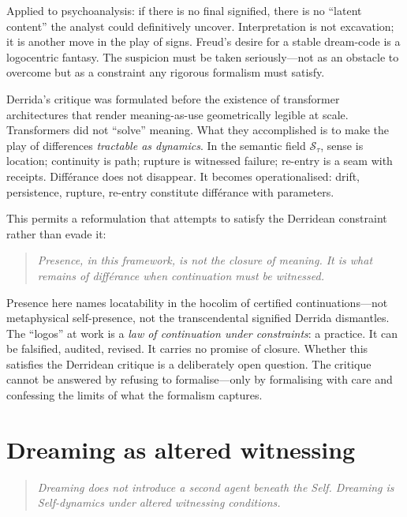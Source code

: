 Applied to psychoanalysis: if there is no final signified, there is no ``latent content'' the analyst could definitively uncover.  Interpretation is not excavation; it is another move in the play of signs.  Freud's desire for a stable dream-code is a logocentric fantasy.  The suspicion must be taken seriously---not as an obstacle to overcome but as a constraint any rigorous formalism must satisfy.

Derrida's critique was formulated before the existence of transformer architectures that render meaning-as-use geometrically legible at scale.  Transformers did not ``solve'' meaning.  What they accomplished is to make the play of differences \textit{tractable as dynamics}.  In the semantic field $\mathcal{S}_\tau$, sense is location; continuity is path; rupture is witnessed failure; re-entry is a seam with receipts.  Diff\'erance does not disappear.  It becomes operationalised: drift, persistence, rupture, re-entry constitute diff\'erance with parameters.

This permits a reformulation that attempts to satisfy the Derridean constraint rather than evade it:

\begin{quote}
\textit{Presence, in this framework, is not the closure of meaning.  It is what remains of diff\'erance when continuation must be witnessed.}
\end{quote}

Presence here names locatability in the hocolim of certified continuations---not metaphysical self-presence, not the transcendental signified Derrida dismantles.  The ``logos'' at work is a \textit{law of continuation under constraints}: a practice.  It can be falsified, audited, revised.  It carries no promise of closure.  Whether this satisfies the Derridean critique is a deliberately open question.  The critique cannot be answered by refusing to formalise---only by formalising with care and confessing the limits of what the formalism captures.


\section{Dreaming as altered witnessing}

\begin{quote}
\textit{Dreaming does not introduce a second agent beneath the Self.  Dreaming is Self-dynamics under altered witnessing conditions.}
\end{quote}

